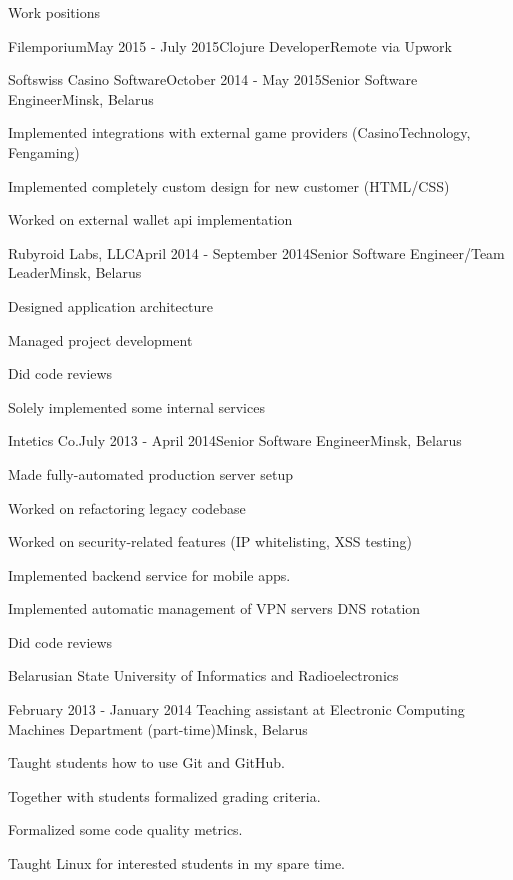 \documentclass{resume} %
\begin{document}
\begin{rSection}{Work positions}
\begin{rSubsection}{Filemporium}{May 2015 - July 2015}{Clojure Developer}{Remote via Upwork}
\end{rSubsection}

\begin{rSubsection}{Softswiss Casino Software}{October 2014 - May 2015}{Senior Software Engineer}{Minsk, Belarus}
\item Implemented integrations with external game providers (CasinoTechnology, Fengaming)
\item Implemented completely custom design for new customer (HTML/CSS)
\item Worked on external wallet api implementation
\end{rSubsection}

\begin{rSubsection}{Rubyroid Labs, LLC}{April 2014 - September 2014}{Senior Software Engineer/Team Leader}{Minsk, Belarus}
\item Designed application architecture
\item Managed project development
\item Did code reviews
\item Solely implemented some internal services
\end{rSubsection}

\begin{rSubsection}{Intetics Co.}{July 2013 - April 2014}{Senior Software Engineer}{Minsk, Belarus}
\item Made fully-automated production server setup
\item Worked on refactoring legacy codebase
\item Worked on security-related features (IP whitelisting, XSS testing)
\item Implemented backend service for mobile apps.
\item Implemented automatic management of VPN servers DNS rotation
\item Did code reviews
\end{rSubsection}

\begin{rSubsection}{\parbox[t][2em][t]{9cm}{Belarusian State University of Informatics and Radioelectronics}}{February 2013 - January 2014 }{Teaching assistant at Electronic Computing Machines Department (part-time)}{Minsk, Belarus}
\item Taught students how to use Git and GitHub.
\item Together with students formalized grading criteria.
\item Formalized some code quality metrics.
\item Taught Linux for interested students in my spare time.
\end{rSubsection}


\end{rSection}
\end{document}
